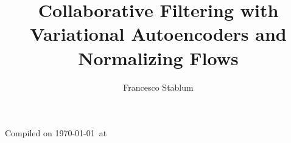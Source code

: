 \documentclass[12pt]{book}
\author{Francesco Stablum}
\title{Collaborative Filtering with Variational Autoencoders and Normalizing Flows}
\begin{document}
\maketitle
Compiled on \today\ at \currenttime
\tableofcontents












%
%

%
%
%
%
%
%
%
%
%
%
%
%
%
%
%
%
%
%
%
%


\end{document}
